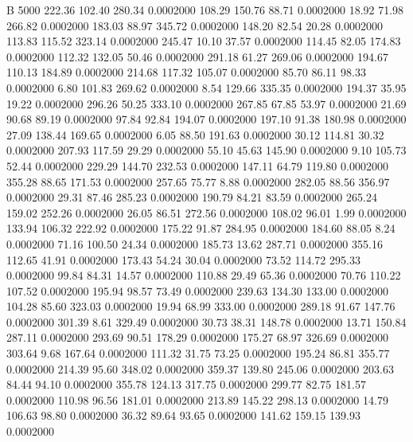 


B 5000
 222.36  102.40  280.34   0.0002000
 108.29  150.76   88.71   0.0002000
  18.92   71.98  266.82   0.0002000
 183.03   88.97  345.72   0.0002000
 148.20   82.54   20.28   0.0002000
 113.83  115.52  323.14   0.0002000
 245.47   10.10   37.57   0.0002000
 114.45   82.05  174.83   0.0002000
 112.32  132.05   50.46   0.0002000
 291.18   61.27  269.06   0.0002000
 194.67  110.13  184.89   0.0002000
 214.68  117.32  105.07   0.0002000
  85.70   86.11   98.33   0.0002000
   6.80  101.83  269.62   0.0002000
   8.54  129.66  335.35   0.0002000
 194.37   35.95   19.22   0.0002000
 296.26   50.25  333.10   0.0002000
 267.85   67.85   53.97   0.0002000
  21.69   90.68   89.19   0.0002000
  97.84   92.84  194.07   0.0002000
 197.10   91.38  180.98   0.0002000
  27.09  138.44  169.65   0.0002000
   6.05   88.50  191.63   0.0002000
  30.12  114.81   30.32   0.0002000
 207.93  117.59   29.29   0.0002000
  55.10   45.63  145.90   0.0002000
   9.10  105.73   52.44   0.0002000
 229.29  144.70  232.53   0.0002000
 147.11   64.79  119.80   0.0002000
 355.28   88.65  171.53   0.0002000
 257.65   75.77    8.88   0.0002000
 282.05   88.56  356.97   0.0002000
  29.31   87.46  285.23   0.0002000
 190.79   84.21   83.59   0.0002000
 265.24  159.02  252.26   0.0002000
  26.05   86.51  272.56   0.0002000
 108.02   96.01    1.99   0.0002000
 133.94  106.32  222.92   0.0002000
 175.22   91.87  284.95   0.0002000
 184.60   88.05    8.24   0.0002000
  71.16  100.50   24.34   0.0002000
 185.73   13.62  287.71   0.0002000
 355.16  112.65   41.91   0.0002000
 173.43   54.24   30.04   0.0002000
  73.52  114.72  295.33   0.0002000
  99.84   84.31   14.57   0.0002000
 110.88   29.49   65.36   0.0002000
  70.76  110.22  107.52   0.0002000
 195.94   98.57   73.49   0.0002000
 239.63  134.30  133.00   0.0002000
 104.28   85.60  323.03   0.0002000
  19.94   68.99  333.00   0.0002000
 289.18   91.67  147.76   0.0002000
 301.39    8.61  329.49   0.0002000
  30.73   38.31  148.78   0.0002000
  13.71  150.84  287.11   0.0002000
 293.69   90.51  178.29   0.0002000
 175.27   68.97  326.69   0.0002000
 303.64    9.68  167.64   0.0002000
 111.32   31.75   73.25   0.0002000
 195.24   86.81  355.77   0.0002000
 214.39   95.60  348.02   0.0002000
 359.37  139.80  245.06   0.0002000
 203.63   84.44   94.10   0.0002000
 355.78  124.13  317.75   0.0002000
 299.77   82.75  181.57   0.0002000
 110.98   96.56  181.01   0.0002000
 213.89  145.22  298.13   0.0002000
  14.79  106.63   98.80   0.0002000
  36.32   89.64   93.65   0.0002000
 141.62  159.15  139.93   0.0002000
